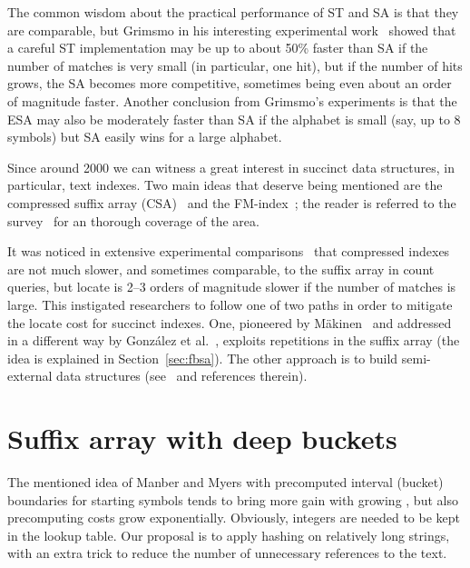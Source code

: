\documentclass{cai}
\begin{document}
The common wisdom about the practical performance of ST and SA 
is that they are comparable, but Grimsmo in his interesting experimental 
work~\cite{Gri07} showed that a careful ST implementation 
may be up to about 50\% faster than SA if the number of matches is very small 
(in particular, one hit), but if the number of hits grows, the SA becomes 
more competitive, sometimes being even about an order of magnitude faster.
Another conclusion from Grimsmo's experiments is that the ESA may also be 
moderately faster than SA if the alphabet is small (say, up to 8 symbols) 
but SA easily wins for a large alphabet.

Since around 2000 we can witness a great interest in succinct data structures, 
in particular, text indexes.
Two main ideas that deserve being mentioned are 
the compressed suffix array (CSA)~\cite{GV00,DBLP:conf/soda/Sadakane02} 
and the FM-index~\cite{FM00}; the reader is referred to the survey~\cite{NMacmcs06} 
for an 
thorough
coverage of the area.

It was noticed in extensive experimental comparisons~\cite{FGNVjea08,GP14} 
that compressed indexes are not much slower, and sometimes comparable, 
to the suffix array in count queries, but locate is 2--3 orders of magnitude 
slower if the number of matches is large.
This instigated researchers to follow one of two paths in order to 
mitigate the locate cost for succinct indexes.
One, pioneered by M{\"a}kinen~\cite{DBLP:conf/cpm/Makinen00,DBLP:journals/fuin/Makinen03} 
and addressed in a different way by Gonz{\'a}lez et al.~\cite{DBLP:conf/cpm/GonzalezN07,GNFjea14},
exploits repetitions in the suffix array (the idea is explained in Section~\ref{sec:fbsa}).
The other approach is to build semi-external data structures 
(see~\cite{GM13,GMCTW14} and references therein).


\section{Suffix array with deep buckets}

The mentioned idea of Manber and Myers with precomputed interval (bucket) 
boundaries for  starting symbols tends to bring more gain with growing , 
but also precomputing costs grow exponentially. 
Obviously,  integers are needed to be kept in the lookup table.
Our proposal is to apply hashing on relatively long strings, with an extra trick 
to reduce the number of 
unnecessary references to the text.
\end{document}
